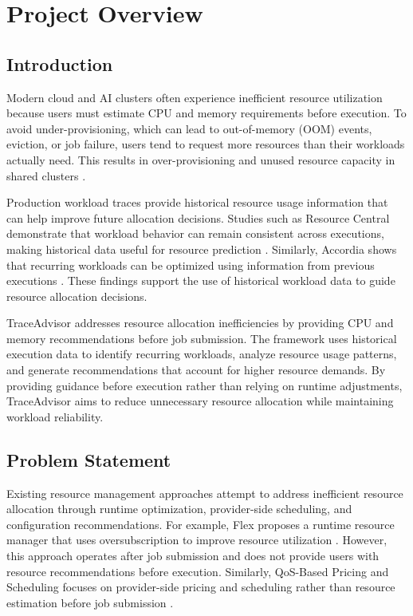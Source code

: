 \documentclass{IEEEtran}
\begin{document}
\tableofcontents

\section{Project Overview}

\subsection{Introduction}

Modern cloud and AI clusters often experience inefficient resource utilization because users must estimate CPU and memory requirements before execution. To avoid under-provisioning, which can lead to out-of-memory (OOM) events, eviction, or job failure, users tend to request more resources than their workloads actually need. This results in over-provisioning and unused resource capacity in shared clusters \cite{ref01}.

Production workload traces provide historical resource usage information that can help improve future allocation decisions. Studies such as Resource Central demonstrate that workload behavior can remain consistent across executions, making historical data useful for resource prediction \cite{ref02}. Similarly, Accordia shows that recurring workloads can be optimized using information from previous executions \cite{ref03}. These findings support the use of historical workload data to guide resource allocation decisions.

TraceAdvisor addresses resource allocation inefficiencies by providing CPU and memory recommendations before job submission. The framework uses historical execution data to identify recurring workloads, analyze resource usage patterns, and generate recommendations that account for higher resource demands. By providing guidance before execution rather than relying on runtime adjustments, TraceAdvisor aims to reduce unnecessary resource allocation while maintaining workload reliability.


\subsection{Problem Statement}

Existing resource management approaches attempt to address inefficient resource allocation through runtime optimization, provider-side scheduling, and configuration recommendations. For example, Flex proposes a runtime resource manager that uses oversubscription to improve resource utilization \cite{ref01}. However, this approach operates after job submission and does not provide users with resource recommendations before execution. Similarly, QoS-Based Pricing and Scheduling focuses on provider-side pricing and scheduling rather than resource estimation before job submission \cite{ref04}.
\end{document}
